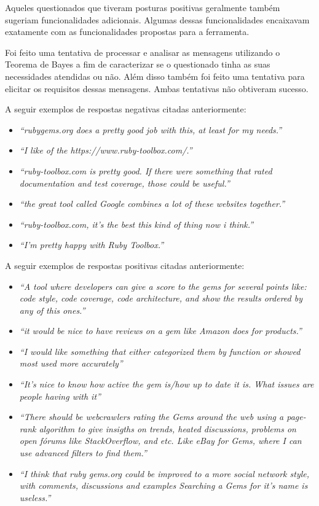 Aqueles questionados que tiveram posturas positivas geralmente também sugeriam funcionalidades adicionais. Algumas dessas funcionalidades encaixavam exatamente com as funcionalidades propostas para a ferramenta.

Foi feito uma tentativa de processar e analisar as mensagens utilizando o Teorema de Bayes a fim de caracterizar se o questionado tinha as suas necessidades atendidas ou não. Além disso também foi feito uma tentativa para elicitar os requisitos dessas mensagens. Ambas tentativas não obtiveram sucesso.

A seguir exemplos de respostas negativas citadas anteriormente: 

\begin{itemize}
	\item \textit{``rubygems.org does a pretty good job with this, at least for my needs.''}
    \item \textit{``I like of the https://www.ruby-toolbox.com/.''}
    \item \textit{``ruby-toolbox.com is pretty good. If there were something that rated documentation and test coverage, those could be useful.''}
    \item \textit{``the great tool called Google combines a lot of these websites together.''}
    \item \textit{``ruby-toolbox.com, it's the best this kind of thing now i think.''}
    \item \textit{``I'm pretty happy with Ruby Toolbox.''}
\end{itemize}

A seguir exemplos de respostas positivas citadas anteriormente: 

\begin{itemize}
	\item \textit{``A tool where developers can give a score to the gems for several points like: code style, code coverage, code architecture, and show the results ordered by any of this ones.''}
    \item \textit{``it would be nice to have reviews on a gem like Amazon does for products.''}
    \item \textit{``I would like something that either categorized them by function or showed most used more accurately''}
    \item \textit{``It's nice to know how active the gem is/how up to date it is.  What issues are people having with it''}
    \item \textit{``There should be webcrawlers rating the Gems around the web using a page-rank algorithm to give insigths on trends, heated discussions, problems on open fórums like StackOverflow, and etc. Like eBay for Gems, where I can use advanced filters to find them.''}
    \item \textit{``I think that ruby gems.org could be improved to a more social network style, with comments, discussions and examples
Searching a Gems for it's name is useless.''}
\end{itemize}

